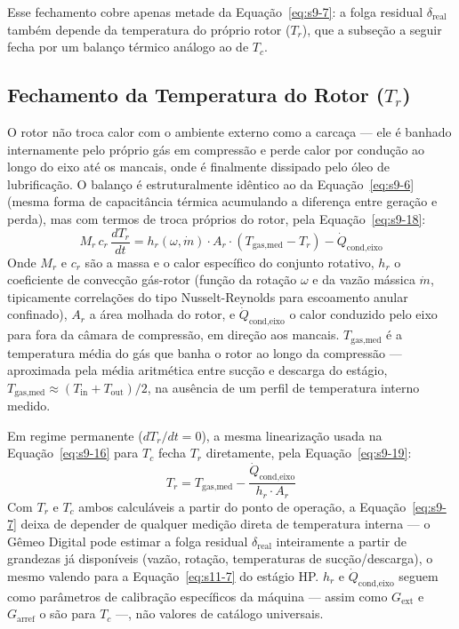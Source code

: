 \documentclass[12pt,a4paper]{article}
\numberwithin{equation}{section}
\numberwithin{table}{section}
\numberwithin{figure}{section}
\begin{document}
{	Esse fechamento cobre apenas metade da Equação~\eqref{eq:s9-7}: a folga residual $\delta_{\text{real}}$ também depende da temperatura do próprio rotor ($T_r$), que a subseção a seguir fecha por um balanço térmico análogo ao de $T_c$.

	\subsection{\textbf{Fechamento da Temperatura do Rotor ($T_r$)}}
	O rotor não troca calor com o ambiente externo como a carcaça — ele é banhado internamente pelo próprio gás em compressão e perde calor por condução ao longo do eixo até os mancais, onde é finalmente dissipado pelo óleo de lubrificação. O balanço é estruturalmente idêntico ao da Equação~\eqref{eq:s9-6} (mesma forma de capacitância térmica acumulando a diferença entre geração e perda), mas com termos de troca próprios do rotor, pela Equação~\eqref{eq:s9-18}:
	\begin{equation}\label{eq:s9-18}
 M_r \, c_r \, \frac{dT_r}{dt} = h_r(\omega, \dot{m}) \cdot A_r \cdot (T_{\text{gas,med}} - T_r) - \dot{Q}_{\text{cond,eixo}}
\end{equation}
	Onde $M_r$ e $c_r$ são a massa e o calor específico do conjunto rotativo, $h_r$ o coeficiente de convecção gás-rotor (função da rotação $\omega$ e da vazão mássica $\dot{m}$, tipicamente correlações do tipo Nusselt-Reynolds para escoamento anular confinado), $A_r$ a área molhada do rotor, e $\dot{Q}_{\text{cond,eixo}}$ o calor conduzido pelo eixo para fora da câmara de compressão, em direção aos mancais. $T_{\text{gas,med}}$ é a temperatura média do gás que banha o rotor ao longo da compressão — aproximada pela média aritmética entre sucção e descarga do estágio, $T_{\text{gas,med}} \approx (T_{\text{in}} + T_{\text{out}})/2$, na ausência de um perfil de temperatura interno medido.

	Em regime permanente ($dT_r/dt = 0$), a mesma linearização usada na Equação~\eqref{eq:s9-16} para $T_c$ fecha $T_r$ diretamente, pela Equação~\eqref{eq:s9-19}:
	\begin{equation}\label{eq:s9-19}
 T_r = T_{\text{gas,med}} - \frac{\dot{Q}_{\text{cond,eixo}}}{h_r \cdot A_r}
\end{equation}
	Com $T_r$ e $T_c$ ambos calculáveis a partir do ponto de operação, a Equação~\eqref{eq:s9-7} deixa de depender de qualquer medição direta de temperatura interna — o Gêmeo Digital pode estimar a folga residual $\delta_{\text{real}}$ inteiramente a partir de grandezas já disponíveis (vazão, rotação, temperaturas de sucção/descarga), o mesmo valendo para a Equação~\eqref{eq:s11-7} do estágio HP. $h_r$ e $\dot{Q}_{\text{cond,eixo}}$ seguem como parâmetros de calibração específicos da máquina — assim como $G_{\text{ext}}$ e $G_{\text{arref}}$ o são para $T_c$ —, não valores de catálogo universais.

}
\end{document}
